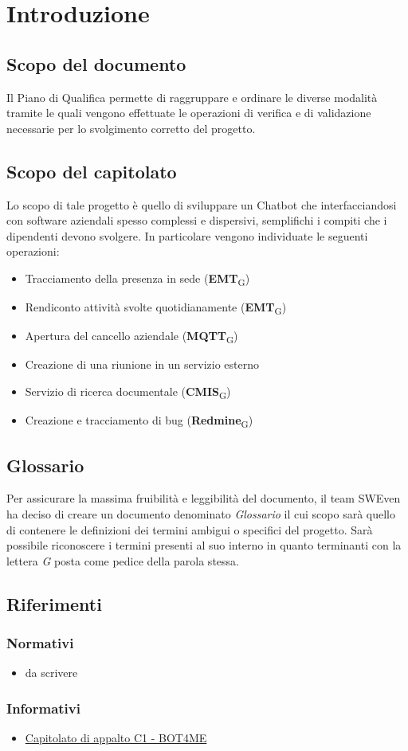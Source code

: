 \section{Introduzione}
\subsection{Scopo del documento}
Il Piano di Qualifica permette di raggruppare e ordinare le diverse modalità tramite le quali 
vengono effettuate le operazioni di verifica e di validazione necessarie per lo svolgimento corretto 
del progetto.

\subsection{Scopo del capitolato}
Lo scopo di tale progetto è quello di sviluppare un Chatbot che interfacciandosi con software aziendali spesso complessi e dispersivi, semplifichi i compiti che i dipendenti devono svolgere. In particolare vengono individuate le seguenti operazioni: 
\begin{itemize}
	\item Tracciamento della presenza in sede (\textbf{EMT}\textsubscript{G})
	\item Rendiconto attività svolte quotidianamente (\textbf{EMT}\textsubscript{G})
	\item Apertura del cancello aziendale (\textbf{MQTT}\textsubscript{G})
	\item Creazione di una riunione in un servizio esterno
	\item Servizio di ricerca documentale (\textbf{CMIS}\textsubscript{G})
	\item Creazione e tracciamento di bug (\textbf{Redmine}\textsubscript{G})
\end{itemize}

\subsection{Glossario}
Per assicurare la massima fruibilità e leggibilità del documento, il team SWEven ha deciso di creare un documento denominato \textit{Glossario} il cui scopo sarà quello di contenere le definizioni dei termini ambigui o specifici del progetto. Sarà possibile riconoscere i termini presenti al suo interno in quanto terminanti con la lettera \textit{G} posta come pedice della parola stessa. 
\subsection{Riferimenti}

\subsubsection{Normativi}
\begin{itemize}
	\item da scrivere
\end{itemize}

\subsubsection{Informativi}
\begin{itemize}
	\item \href{https://www.math.unipd.it/~tullio/IS-1/2021/Progetto/C1.pdf}{\color{blue} Capitolato di appalto C1 - BOT4ME}
\end{itemize}
\newpage